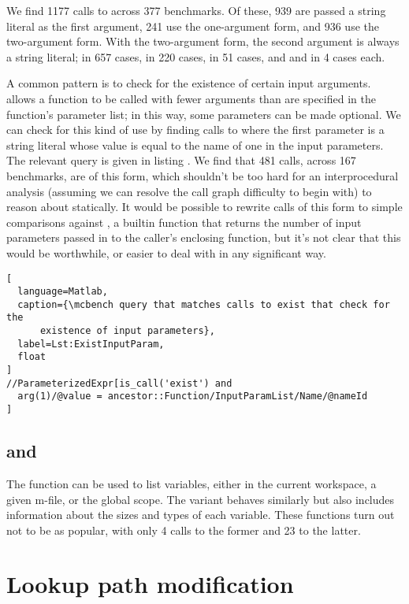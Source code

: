 We find 1177 calls to  across 377 benchmarks. Of these, 939 are
passed a string literal as the first argument, 241 use the one-argument form,
and 936 use the two-argument form. With the two-argument form, the second
argument is always a string literal;  in 657 cases, 
in 220 cases,  in 51 cases, and  and 
in 4 cases each.

A common pattern is to check for the existence of certain input arguments.
\matlab allows a function to be called with fewer arguments than are specified
in the function's parameter list; in this way, some parameters can be made
optional. We can check for this kind of use by finding calls to 
where the first parameter is a string literal whose value is equal to the name
of one in the input parameters. The relevant query is given in listing
. We find that 481 calls, across 167 benchmarks,
are of this form, which shouldn't be too hard for an interprocedural analysis
(assuming we can resolve the call graph difficulty to begin with) to reason
about statically. It would be possible to rewrite calls of this form to simple
comparisons against , a builtin \matlab function that returns the
number of input parameters passed in to the caller's enclosing function, but
it's not clear that this would be worthwhile, or easier to deal with in any
significant way.

\begin{lstlisting}[
  language=Matlab,
  caption={\mcbench query that matches calls to exist that check for the
      existence of input parameters},
  label=Lst:ExistInputParam,
  float
]
//ParameterizedExpr[is_call('exist') and
  arg(1)/@value = ancestor::Function/InputParamList/Name/@nameId
]
\end{lstlisting}

\subsection{ and }

The  function can be used to list variables, either in the current
workspace, a given m-file, or the global scope. The  variant behaves
similarly but also includes information about the sizes and types of each
variable. These functions turn out not to be as popular, with only 4 calls to
the former and 23 to the latter.

\section{Lookup path modification}

